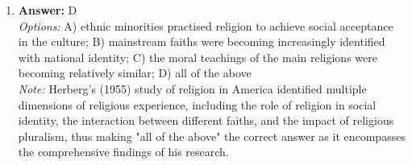 \documentclass[12pt]{article}
\begin{document}
\begin{enumerate}[label=\arabic*.]
\\ \textit{Note:} The 'correspondence principle' posits that the structure and practices of schools mirror the hierarchical and authoritarian nature of the workplace, thereby socializing students into obedience and conformity, which are essential traits for future employment.
\item \textbf{Answer:} D
\\ \textit{Options:} A) ethnic minorities practised religion to achieve social acceptance in the culture; B) mainstream faiths were becoming increasingly identified with national identity; C) the moral teachings of the main religions were becoming relatively similar; D) all of the above
\\ \textit{Note:} Herberg's (1955) study of religion in America identified multiple dimensions of religious experience, including the role of religion in social identity, the interaction between different faiths, and the impact of religious pluralism, thus making "all of the above" the correct answer as it encompasses the comprehensive findings of his research.
\end{enumerate}
\end{document}
